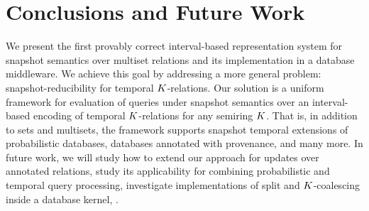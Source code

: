 %






\section{Conclusions and Future Work}
\label{sec:concl-future-work}

We present the first provably correct interval-based representation system for snapshot semantics over multiset relations and its implementation in a database middleware.
We achieve this goal by addressing a more general problem: snapshot-reducibility for temporal $K$-relations.
Our solution is a uniform framework for evaluation of queries under snapshot semantics over an interval-based encoding of temporal $K$-relations for any semiring $K$.
That is, in addition to sets and multisets, the framework supports snapshot temporal extensions of probabilistic databases, databases annotated with provenance, and many more.
In future work, we will study how to extend our approach for updates over annotated relations, study its applicability for combining probabilistic and temporal query processing, investigate implementations of split and $K$-coalescing inside a database kernel, .

